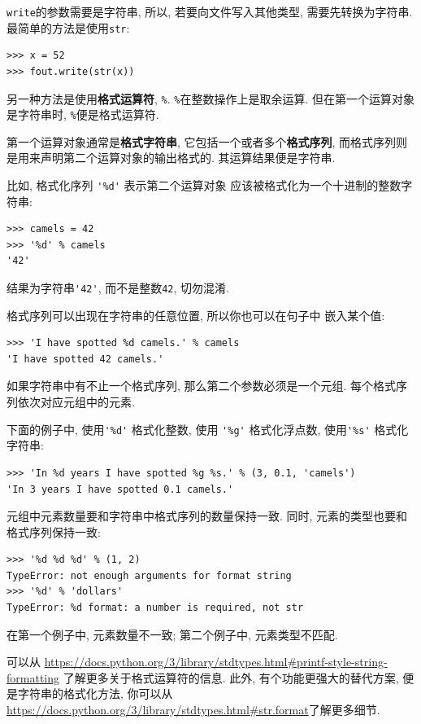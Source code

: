 \documentclass[10pt]{book}
\begin{document}
{\tt write}的参数需要是字符串, 所以, 若要向文件写入其他类型, 
需要先转换为字符串. 最简单的方法是使用{\tt str}:

\begin{verbatim}
>>> x = 52
>>> fout.write(str(x))
\end{verbatim}
%
另一种方法是使用{\bf 格式运算符}, {\tt \%}. 
{\tt \%}在整数操作上是取余运算. 
但在第一个运算对象是字符串时, {\tt \%}便是格式运算符. 

第一个运算对象通常是{\bf 格式字符串}, 它包括一个或者多个{\bf 格式序列}, 
而格式序列则是用来声明第二个运算对象的输出格式的. 
其运算结果便是字符串. 

比如, 格式化序列 \verb"'%d'" 表示第二个运算对象
应该被格式化为一个十进制的整数字符串:

\begin{verbatim}
>>> camels = 42
>>> '%d' % camels
'42'
\end{verbatim}
%
结果为字符串\verb"'42'", 而不是整数{\tt 42}, 切勿混淆.

格式序列可以出现在字符串的任意位置, 所以你也可以在句子中
嵌入某个值:

\begin{verbatim}
>>> 'I have spotted %d camels.' % camels
'I have spotted 42 camels.'
\end{verbatim}
%
如果字符串中有不止一个格式序列, 那么第二个参数必须是一个元组. 
每个格式序列依次对应元组中的元素. 

下面的例子中, 使用\verb"'%d'" 格式化整数, 
使用 \verb"'%g'" 格式化浮点数, 
使用\verb"'%s'" 格式化字符串:

\begin{verbatim}
>>> 'In %d years I have spotted %g %s.' % (3, 0.1, 'camels')
'In 3 years I have spotted 0.1 camels.'
\end{verbatim}
%
元组中元素数量要和字符串中格式序列的数量保持一致. 
同时, 元素的类型也要和格式序列保持一致:

\begin{verbatim}
>>> '%d %d %d' % (1, 2)
TypeError: not enough arguments for format string
>>> '%d' % 'dollars'
TypeError: %d format: a number is required, not str
\end{verbatim}
%
在第一个例子中, 元素数量不一致;
第二个例子中, 元素类型不匹配.

可以从
\url{https://docs.python.org/3/library/stdtypes.html#printf-style-string-formatting}
了解更多关于格式运算符的信息. 
此外, 有个功能更强大的替代方案, 便是字符串的格式化方法, 你可以从
\url{https://docs.python.org/3/library/stdtypes.html#str.format}了解更多细节. 
\end{document}

